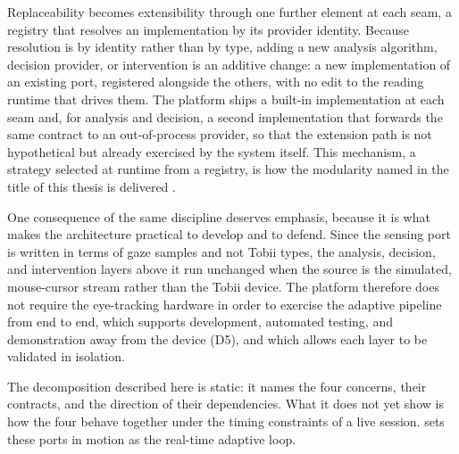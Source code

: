 Replaceability becomes extensibility through one further element at each seam, a registry that resolves an implementation by its provider identity.
Because resolution is by identity rather than by type, adding a new analysis algorithm, decision provider, or intervention is an additive change: a new implementation of an existing port, registered alongside the others, with no edit to the reading runtime that drives them.
The platform ships a built-in implementation at each seam and, for analysis and decision, a second implementation that forwards the same contract to an out-of-process provider, so that the extension path is not hypothetical but already exercised by the system itself.
This mechanism, a strategy selected at runtime from a registry, is how the modularity named in the title of this thesis is delivered \cite{gamma1994designpatterns}.

One consequence of the same discipline deserves emphasis, because it is what makes the architecture practical to develop and to defend.
Since the sensing port is written in terms of gaze samples and not Tobii types, the analysis, decision, and intervention layers above it run unchanged when the source is the simulated, mouse-cursor stream rather than the Tobii device.
The platform therefore does not require the eye-tracking hardware in order to exercise the adaptive pipeline from end to end, which supports development, automated testing, and demonstration away from the device (D5), and which allows each layer to be validated in isolation.

The decomposition described here is static: it names the four concerns, their contracts, and the direction of their dependencies.
What it does not yet show is how the four behave together under the timing constraints of a live session.
 sets these ports in motion as the real-time adaptive loop.
